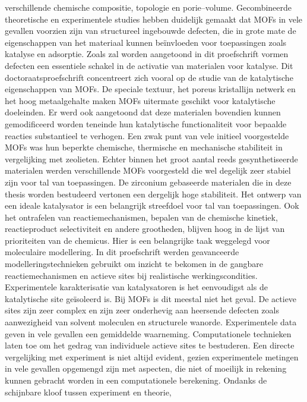 verschillende chemische compositie, topologie en porie--volume.
Gecombineerde theoretische en experimentele studies hebben duidelijk gemaakt dat
MOFs in vele gevallen voorzien zijn van structureel ingebouwde defecten, die in grote 
mate de eigenschappen van het materiaal kunnen be\"invloeden voor toepassingen
zoals katalyse en adsorptie. Zoals zal worden aangetoond in dit proefschrift vormen defecten een essentiele schakel
in de activatie van materialen voor katalyse. Dit doctoraatsproefschrift concentreert zich vooral op de studie van de katalytische eigenschappen van MOFs.
\npar
De speciale textuur, het poreus kristallijn netwerk en het hoog metaalgehalte maken MOFs uitermate geschikt voor katalytische doeleinden. 
Er werd ook aangetoond dat deze materialen bovendien kunnen gemodificeerd worden teneinde hun katalytische functionaliteit voor bepaalde
reacties substantieel te verhogen. Een zwak punt van vele initieel voorgestelde MOFs was hun beperkte chemische, thermische en mechanische stabiliteit 
in vergelijking met zeolieten. Echter binnen het groot aantal reeds gesynthetiseerde materialen werden verschillende MOFs voorgesteld die wel degelijk zeer 
stabiel zijn voor tal van toepassingen. De zirconium gebaseerde materialen die in deze thesis worden bestudeerd vertonen een dergelijk hoge stabiliteit. 
Het ontwerp van een ideale katalysator is een belangrijk streefdoel voor tal van toepassingen. Ook het ontrafelen van reactiemechanismen, bepalen van de 
chemische kinetiek, reactieproduct selectiviteit en andere grootheden,
blij\-ven hoog in de lijst van prioriteiten van de chemicus.
Hier is een belangrijke taak weggelegd voor moleculaire modellering. In dit proefschrift werden geavanceerde modelleringstechnieken gebruikt om inzicht 
te bekomen in de gangbare reactiemechanismen en actieve sites bij realistische
werkingscondities. Experimentele karakterisatie van katalysatoren is het eenvoudigst als de katalytische site ge\"isoleerd is. Bij MOFs is dit meestal
niet het geval. De actieve sites zijn zeer complex en zijn zeer onderhevig aan heersende defecten zoals aanwezigheid
van solvent moleculen en structurele wanorde. Experimentele data geven in vele gevallen een gemiddelde waarneming. 
Computationele technieken laten toe om het gedrag van individuele actieve sites te bestuderen. 
Een directe vergelijking met experiment is niet altijd evident, gezien experimentele metingen in vele gevallen opgemengd zijn met aspecten,
die niet of moeilijk in rekening kunnen gebracht worden in een computationele berekening. Ondanks de schijnbare kloof tussen experiment en theorie,
